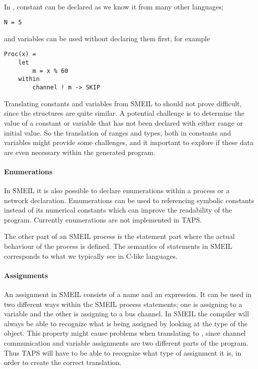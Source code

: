 \\

In \cspm, constant can be declared as we know it from many other languages;
\begin{verbatim}
N = 5
\end{verbatim}
and variables can be used without declaring them first, for example
\begin{verbatim}
Proc(x) =
    let
        m = x % 60
    within
        channel ! m -> SKIP
\end{verbatim}

Translating constants and variables from SMEIL to \cspm should not prove difficult, since the structures are quite similar.
A potential challenge is to determine the value of a constant or variable that has not been declared with either range or initial value. So the translation of ranges and types, both in constants and variables might provide some challenges, and it important to explore if these data are even necessary within the generated \cspm program.
\paragraph{Enumerations}
In SMEIL it is also possible to declare enumerations within a process or a network declaration. Emumerations can be used to referencing symbolic constants instead of its numerical constants which can improve the readability of the program.
Currently enumerations are not implemented in TAPS.




The other part of an SMEIL process is the statement part where the actual behaviour of the process is defined. The semantics of statements in SMEIL corresponds to what we typically see in C-like languages.

\paragraph{Assignments}
An assignment in SMEIL consists of a name and an expression. It can be used in two different ways within the SMEIL process statements; one is assigning to a variable and the other is assigning to a bus channel. In SMEIL the compiler will always be able to recognize what is being assigned by looking at the type of the object.
This property might cause problems when translating to \cspm, since channel communication and variable assignments are two different parts of the \cspm program. Thus TAPS will have to be able to recognize what type of assignment it is, in order to create the correct translation.
